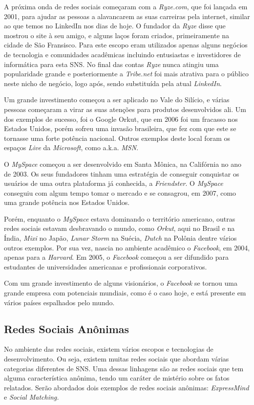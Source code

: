 A próxima onda de redes sociais começaram com a \textit{Ryze.com}, que foi lançada em 2001,
para ajudar as pessoas a alavancarem as suas carreiras pela internet, similar
ao que temos no LinkedIn nos dias de hoje. O fundador da \textit{Ryze} disse que mostrou o site à seu amigo,
e alguns laços foram criados, primeiramente na cidade de São Fransisco. Para este
escopo eram utilizados apenas alguns negócios de tecnologia e comunidades acadêmicas
incluindo entusiastas e investidores de informática para esta SNS. No final das
contas \textit{Ryze} nunca atingiu uma popularidade grande e posteriormente a \textit{Tribe.net} foi mais atrativa para o
público neste nicho de negócio, logo após, sendo substituída pela atual \textit{LinkedIn}.

Um grande investimento começou a ser aplicado no Vale do Silício, e várias pessoas
começaram a virar as suas atenções para produtos desenvolvidos ali. Um dos exemplos
de sucesso, foi o Google Orkut, que em 2006 foi  um fracasso nos Estados Unidos, porém
sofreu uma invasão brasileira, que fez com que este se tornasse uma forte potência
nacional. Outros exemplos deste local foram os espaços \textit{Live} da \textit{Microsoft}, como a.k.a. \textit{MSN}.

O \textit{MySpace} começou a ser desenvolvido em Santa Mônica, na Califórnia no ano de 2003.
Os seus fundadores tinham uma estratégia de conseguir conquistar os usuários de uma
outra plataforma já conhecida, a  \textit{Friendster}. O \textit{MySpace} conseguiu com algum tempo
tomar o mercado e se consagrou, em 2007, como uma grande potência nos Estados Unidos.

Porém, enquanto o \textit{MySpace} estava dominando o território americano, outras redes sociais
estavam desbravando o mundo, como \textit{Orkut}, aqui no Brasil e na Índia, \textit{Mixi} no Japão, 
\textit{Lunar} \textit{Storm} na Suécia, \textit{Dutch} na Polônia dentre vários outros exemplos. Por sua vez, nascia
no ambiente acadêmico o \textit{Facebook}, em 2004, apenas para a \textit{Harvard}. Em 2005, o \textit{Facebook} começou
a ser difundido para estudantes de universidades americanas e profissionais corporativos.

Com um grande investimento de alguns visionários, o \textit{Facebook} se tornou uma grande empresa
com potenciais mundiais, como é o caso hoje, e está presente em vários países espalhados
pelo mundo.

\subsection{Redes Sociais Anônimas}
\label{sec:redesociaisanonimas}
No ambiente das redes sociais, existem vários escopos e tecnologias de desenvolvimento.
Ou seja, existem muitas redes sociais que abordam várias categorias diferentes
de SNS. Uma dessas linhagens são as redes sociais que tem alguma característica
anônima, tendo um caráter de mistério sobre os fatos relatados. Serão
abordados dois exemplos de redes sociais anônimas: \textit{ExpressMind} e \textit{Social Matching.}

